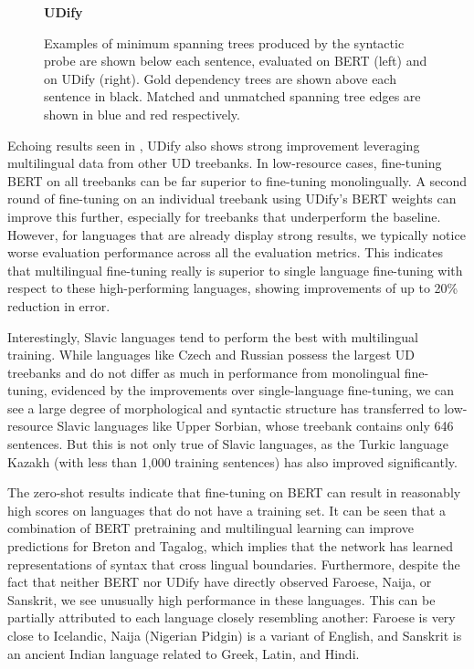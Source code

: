 \documentclass[11pt,a4paper]{article}
\begin{document}
\begin{figure*}[htbp]
\begin{minipage}[b]{0.4\textwidth}
        \hspace{3.8cm}
        \bf UDify
    \end{minipage}

    \caption{\label{fig:deps-probe}
        Examples of minimum spanning trees produced by the syntactic probe are shown below each sentence, evaluated on BERT (left) and on UDify (right). Gold dependency trees are shown above each sentence in black. Matched and unmatched spanning tree edges are shown in blue and red respectively.
    }
\end{figure*}

Echoing results seen in , UDify also shows strong improvement leveraging multilingual data from other UD treebanks.
In low-resource cases, fine-tuning BERT on all treebanks can be far superior to fine-tuning monolingually.
A second round of fine-tuning on an individual treebank using UDify's BERT weights can improve this further, especially for treebanks that underperform the baseline.
However, for languages that are already display strong results, we typically notice worse evaluation performance across all the evaluation metrics.
This indicates that multilingual fine-tuning really is superior to single language fine-tuning with respect to these high-performing languages, showing improvements of up to 20\% reduction in error.

Interestingly, Slavic languages tend to perform the best with multilingual training.
While languages like Czech and Russian possess the largest UD treebanks and do not differ as much in performance from monolingual fine-tuning, evidenced by the improvements over single-language fine-tuning, we can see a large degree of morphological and syntactic structure has transferred to low-resource Slavic languages like Upper Sorbian, whose treebank contains only 646 sentences.
But this is not only true of Slavic languages, as the Turkic language Kazakh (with less than 1,000 training sentences) has also improved significantly.

The zero-shot results indicate that fine-tuning on BERT can result in reasonably high scores on languages that do not have a training set.
It can be seen that a combination of BERT pretraining and multilingual learning can improve predictions for Breton and Tagalog, which implies that the network has learned representations of syntax that cross lingual boundaries.
Furthermore, despite the fact that neither BERT nor UDify have directly observed Faroese, Naija, or Sanskrit, we see unusually high performance in these languages.
This can be partially attributed to each language closely resembling another: Faroese is very close to Icelandic, Naija (Nigerian Pidgin) is a variant of English, and Sanskrit is an ancient Indian language related to Greek, Latin, and Hindi.
\end{document}
